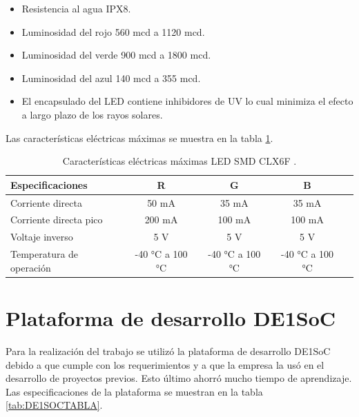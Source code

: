 
\begin{itemize}
\item Resistencia al agua IPX8.
\item Luminosidad del rojo 560 mcd a 1120 mcd.
\item Luminosidad del verde 900 mcd a 1800 mcd.
\item Luminosidad del azul 140 mcd a 355 mcd.
\item El encapsulado del LED contiene inhibidores de UV lo cual minimiza el efecto a largo plazo de los rayos solares.
\end{itemize}

Las características eléctricas máximas se muestra en la tabla \ref{tab:MAXLEDCLX6F}.


\begin{table}[h]
\centering
\caption[Características eléctricas máximas LED CLX6F]{Características eléctricas máximas LED SMD CLX6F \protect\footnotemark.}
\begin{tabular}{l c c c c}
\toprule
\textbf{Especificaciones}& \textbf{R} & \textbf{G} & \textbf{B}\\
\midrule 


Corriente directa &50 mA &35 mA &35 mA\\
Corriente directa pico &200 mA &100 mA &100 mA \\
Voltaje inverso &5 V &5 V &5 V\\
Temperatura de operación &-40 \si{\degree}C a 100 \si{\degree}C  &-40 \si{\degree}C a 100 \si{\degree}C  &-40 \si{\degree}C a 100 \si{\degree}C\\


\bottomrule
\hline
\end{tabular}
\label{tab:MAXLEDCLX6F}
\end{table}




\section{ Plataforma de desarrollo DE1SoC}
Para la realización del trabajo se utilizó la plataforma de desarrollo DE1SoC debido a que cumple con los requerimientos y a que la empresa la usó en el desarrollo de proyectos previos. Esto último ahorró mucho tiempo de aprendizaje. Las especificaciones de la plataforma se muestran en la tabla \ref{tab:DE1SOCTABLA}.



